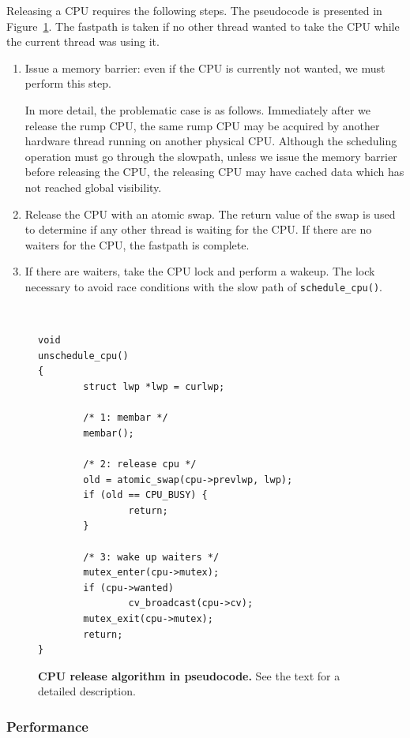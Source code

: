 Releasing a CPU requires the following steps.  The pseudocode is
presented in Figure~\ref{fig:cpuunsched}.  The fastpath is taken
if no other thread wanted to take the CPU while the current thread
was using it.

\begin{enumerate}
\item   Issue a memory barrier: even if the CPU is currently not
	wanted, we must perform this step.

	In more detail, the problematic case is as follows.
	Immediately after we release the rump CPU, the same rump
	CPU may be acquired by another hardware thread running on
	another physical CPU.  Although the scheduling operation
	must go through the slowpath, unless we issue the memory
	barrier before releasing the CPU, the releasing CPU may
	have cached data which has not reached global visibility.

\item   Release the CPU with an atomic swap.  The return value of
	the swap is used to determine if any other thread is waiting
	for the CPU.  If there are no waiters for the CPU, the
	fastpath is complete.

\item	If there are waiters, take the CPU lock and perform a
	wakeup.  The lock necessary to avoid race conditions with
	the slow path of \verb+schedule_cpu()+.
\end{enumerate}

\begin{figure}[p]
{\tt \scriptsize  
\begin{verbatim}
void
unschedule_cpu()
{
        struct lwp *lwp = curlwp;

        /* 1: membar */
        membar();

        /* 2: release cpu */
        old = atomic_swap(cpu->prevlwp, lwp);
        if (old == CPU_BUSY) {
                return;
        }

        /* 3: wake up waiters */
        mutex_enter(cpu->mutex);
        if (cpu->wanted)
                cv_broadcast(cpu->cv);
        mutex_exit(cpu->mutex);
        return;
}
\end{verbatim}}
\caption[CPU release algorithm in pseudocode]{\textbf{CPU release
algorithm in pseudocode.}  See the text for a detailed description.}
\label{fig:cpuunsched}
\end{figure}
\clearpage

\subsubsection*{Performance}

